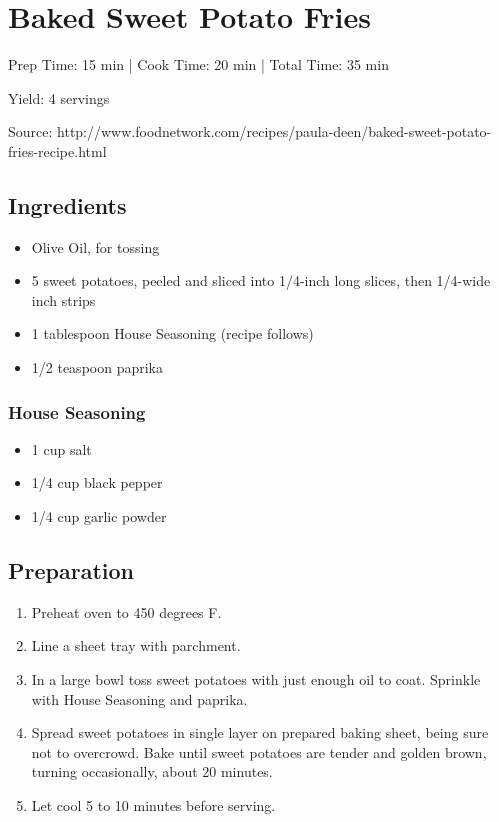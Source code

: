\section{Baked Sweet Potato Fries}

\begin{center}
Prep Time: 15 min |
Cook Time: 20 min |
Total Time: 35 min

\noindent Yield: 4 servings

\vspace{1em}

Source: http://www.foodnetwork.com/recipes/paula-deen/baked-sweet-potato-fries-recipe.html
\end{center}

\subsection{Ingredients}
\begin{multicols}{2}
\begin{itemize}
    \item Olive Oil, for tossing
    \item 5 sweet potatoes, peeled and sliced into 1/4-inch long slices, then 1/4-wide inch strips
    \item 1 tablespoon House Seasoning (recipe follows)
    \item 1/2 teaspoon paprika
\end{itemize}
\end{multicols}
\subsubsection{House Seasoning}
\begin{multicols}{2}
\begin{itemize}
    \item 1 cup salt
    \item 1/4 cup black pepper
    \item 1/4 cup garlic powder
\end{itemize}
\end{multicols}

\subsection{Preparation}
\begin{enumerate}
    \item Preheat oven to 450 degrees F.
    \item Line a sheet tray with parchment.
    \item In a large bowl toss sweet potatoes with just enough oil to coat. Sprinkle with House Seasoning and paprika.
    \item Spread sweet potatoes in single layer on prepared baking sheet, being sure not to overcrowd. Bake until sweet potatoes are tender and golden brown, turning occasionally, about 20 minutes.
    \item Let cool 5 to 10 minutes before serving.
\end{enumerate}

